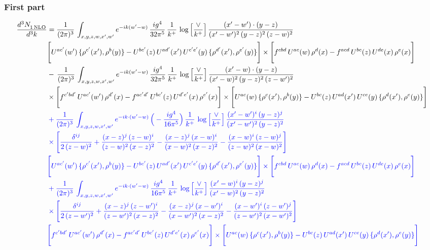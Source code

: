 \documentclass[9pt]{article}
\newcommand{\nc}{\color{blue}}
\numberwithin{equation}{section}
\begin{document}
\subsubsection{First part}
\begin{align}
 \frac{d^{3}N_{1\,\rm NLO}^{\rm}}{d^{3}k}  & =    \frac{1}{(2\pi)^{3}}\,\int_{x,y,z,w,x',w^{\prime}} e^{-ik(w^{\prime}-w)}\, \frac{ig^{4}}{32\pi^{5}}\,\frac{1}{k^{+}}\,\log{\left[\frac{\vee}{ k^{+}}\right]}\, \frac{(x'-w')\cdot (y-z)}{(x'-w')^{2}\,(y-z)^{2}\,(z-w)^{2}}\notag \\ &  \Bigg[U^{ac'}(w')\,\{\rho^{c'}(x'),\rho^{b}(y)\}-U^{bc'}(z)\,U^{ad'}(x')\,U^{c'e'}(y)\, \{\rho^{d'}(x'),\rho^{e'}(y)\}\Bigg]\times \Bigg[f^{cbd}\,U^{ac}(w)\,\rho^{d}(x)-f^{acd}\, U^{bc}(z)\,U^{de}(x)\,\rho^{e}(x)\Bigg]\notag \\ & -\, \frac{1}{(2\pi)^{3}}\,\int_{x,y,z,w,x',w^{\prime}} e^{-ik(w^{\prime}-w)}\,\frac{ig^{4}}{32\pi^{5}}\,\frac{1}{k^{+}}\,\log{\left[\frac{\vee}{k^{+}}\right]}\, \frac{(x'-w)\cdot (y-z)}{(x'-w)^{2}\,(y-z)^{2}\,(z-w')^{2}}\notag \\ &  \times\Bigg[f^{c'bd'}\,U^{ac'}(w')\,\rho^{d'}(x)-f^{ac'd'}\, U^{bc'}(z)\,U^{d'e'}(x)\,\rho^{e'}(x)\Bigg] \times \Bigg[U^{ac}(w)\,\{\rho^{c}(x'),\rho^{b}(y)\}-U^{bc}(z)\,U^{ad}(x')\,U^{ce}(y)\, \{\rho^{d}(x'),\rho^{e}(y)\}\Bigg]
\notag \\ & \nc +\frac{1}{(2\pi)^{3}}\,\int_{x,y,z,w,x',w'}e^{-ik\cdot (w^\prime-w)}\,\Big(-\frac{ig^{4}}{16\pi^{5}}\Big)\,\frac{1}{k^{+}}\,\log{\left[\frac{\vee}{k^{+}}\right]}\,\frac{(x'-w')^{i}\,(y-z)^{j}}{(x'-w')^{2}\,(y-z)^{2}}\notag \\ & \nc \times \Bigg[\frac{\delta^{ij}}{2\,(z-w)^{2}}+\frac{(x-z)^{j}\,(z-w)^{i}}{(z-w)^{2}\,(x-z)^{2}}-\frac{(x-z)^{j}\,(x-w)^{i}}{(x-w)^{2}\,(x-z)^{2}}-\frac{(x-w)^{i}\,(z-w)^{j}}{(z-w)^{2}\,(x-w)^{2}}\Bigg]\notag \\ & \nc \Bigg[U^{ac'}(w')\,\{\rho^{c'}(x'),\rho^{b}(y)\}-U^{bc'}(z)\,U^{ad'}(x')\,U^{c'e'}(y)\, \{\rho^{d'}(x'),\rho^{e'}(y)\}\Bigg]\times \Bigg[f^{cbd}\,U^{ac}(w)\,\rho^{d}(x)-f^{acd}\, U^{bc}(z)\,U^{de}(x)\,\rho^{e}(x)\Bigg]\notag \\ & \nc +\frac{1}{(2\pi)^{3}}\,\int_{x,y,z,w,x',w'}e^{-ik\cdot (w^\prime-w)}\,\frac{ig^{4}}{16\pi^{5}}\,\frac{1}{k^{+}}\,\log{\left[\frac{\vee}{k^{+}}\right]}\,\frac{(x'-w)^{i}\,(y-z)^{j}}{(x'-w)^{2}\,(y-z)^{2}}\notag \\ & \nc \times \Bigg[\frac{\delta^{ij}}{2\,(z-w')^{2}}+\frac{(x-z)^{j}\,(z-w')^{i}}{(z-w')^{2}\,(x-z)^{2}}-\frac{(x-z)^{j}\,(x-w')^{i}}{(x-w')^{2}\,(x-z)^{2}}-\frac{(x-w')^{i}\,(z-w')^{j}}{(z-w')^{2}\,(x-w')^{2}}\Bigg]\notag \\ & \nc \Bigg[f^{c'bd'}\,U^{ac'}(w')\,\rho^{d'}(x)-f^{ac'd'}\, U^{bc'}(z)\,U^{d'e'}(x)\,\rho^{e'}(x)\Bigg] \times \Bigg[U^{ac}(w)\,\{\rho^{c}(x'),\rho^{b}(y)\}-U^{bc}(z)\,U^{ad}(x')\,U^{ce}(y)\, \{\rho^{d}(x'),\rho^{e}(y)\}\Bigg]
\end{align}
\end{document}
